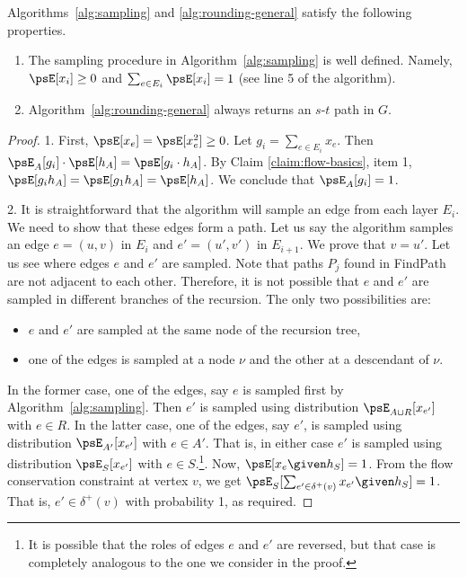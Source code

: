 \documentclass[11pt,a4paper]{article}
\begin{document}
\begin{claim} Algorithms~\ref{alg:sampling} and \ref{alg:rounding-general} satisfy the following properties.
\begin{enumerate}
    \item The sampling procedure in Algorithm~\ref{alg:sampling} is well defined. Namely, $\psE[x_i] \geq 0$ and $\sum_{e\in E_i}\psE[x_i] = 1$ (see line 5 of the algorithm).
    \item Algorithm~\ref{alg:rounding-general} always returns an $s$-$t$ path in $G$.
\end{enumerate}
\end{claim}
\begin{proof}
1. First, $\psE[x_e]= \psE[x_e^2] \geq 0$. Let $g_i = \sum_{e\in E_i} x_e$. Then
$\psE_A[g_i] \cdot \psE[h_A]= \psE[g_i \cdot h_A]$.
By Claim \ref{claim:flow-basics}, item 1, $\psE[g_ih_A] = \psE[g_1 h_A] = \psE[h_A]$. We conclude that $\psE_A[g_i] = 1$.

2. It is straightforward that the algorithm will sample an edge from each layer $E_i$. We need to show that these edges form a path. Let us say the algorithm samples an edge $e= (u,v)$ in $E_i$ and $e'=(u',v')$ in $E_{i+1}$. We prove that $v=u'$. Let us see where edges $e$ and $e'$ are sampled. Note that paths $P_j$ found in FindPath are not adjacent to each other. Therefore, it is not possible that $e$ and $e'$ are sampled in different branches of the recursion. The only two possibilities are:
\begin{itemize}
\item $e$ and $e'$ are sampled at the same node of the recursion tree,
\item one of the edges is sampled at a node $\nu$ and the other at a descendant of $\nu$.
\end{itemize}
In the former case, one of the edges, say $e$ is sampled first by Algorithm~\ref{alg:sampling}. Then $e'$ is sampled using distribution $\psE_{A\cup R}[x_{e'}]$ with $e\in R$. In the latter case, one of the edges, say $e'$, is sampled using distribution $\psE_{A'}[x_{e'}]$ with $e\in A'$. That is, in either case $e'$ is sampled using distribution $\psE_S[x_{e'}]$ with $e\in S$.\footnote{It is possible that the roles of edges $e$ and $e'$ are reversed, but that case is completely analogous to the one we consider in the proof.}. Now, $\psE[x_e\given h_S] = 1$. From the flow conservation constraint at vertex $v$, we get $\psE_S[\sum_{e'\in \delta^+(v)} x_{e'}\given h_S] = 1$. That is, $e'\in \delta^+(v)$ with probability 1, as required.
\end{proof}
\end{document}
